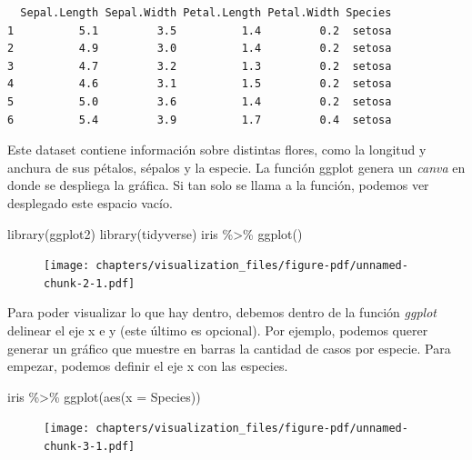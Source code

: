 \documentclass[
  letterpaper,
  DIV=11,
  numbers=noendperiod]{scrreprt}
\newenvironment{Shaded}{\begin{snugshade}}{\end{snugshade}}
\newcommand{\AttributeTok}[1]{\textcolor[rgb]{0.40,0.45,0.13}{#1}}
\newcommand{\FunctionTok}[1]{\textcolor[rgb]{0.28,0.35,0.67}{#1}}
\newcommand{\NormalTok}[1]{\textcolor[rgb]{0.00,0.23,0.31}{#1}}
\newcommand{\SpecialCharTok}[1]{\textcolor[rgb]{0.37,0.37,0.37}{#1}}
\begin{document}
\begin{verbatim}
  Sepal.Length Sepal.Width Petal.Length Petal.Width Species
1          5.1         3.5          1.4         0.2  setosa
2          4.9         3.0          1.4         0.2  setosa
3          4.7         3.2          1.3         0.2  setosa
4          4.6         3.1          1.5         0.2  setosa
5          5.0         3.6          1.4         0.2  setosa
6          5.4         3.9          1.7         0.4  setosa
\end{verbatim}

Este dataset contiene información sobre distintas flores, como la
longitud y anchura de sus pétalos, sépalos y la especie. La función
ggplot genera un \emph{canva} en donde se despliega la gráfica. Si tan
solo se llama a la función, podemos ver desplegado este espacio vacío.

\begin{Shaded}
\begin{Highlighting}[]
\FunctionTok{library}\NormalTok{(ggplot2)}
\FunctionTok{library}\NormalTok{(tidyverse)}
\NormalTok{iris }\SpecialCharTok{\%\textgreater{}\%} 
  \FunctionTok{ggplot}\NormalTok{()}
\end{Highlighting}
\end{Shaded}

\begin{figure}[H]

{\centering \texttt{[image: chapters/visualization\_files/figure-pdf/unnamed-chunk-2-1.pdf]}

}

\end{figure}

Para poder visualizar lo que hay dentro, debemos dentro de la función
\emph{ggplot} delinear el eje x e y (este último es opcional). Por
ejemplo, podemos querer generar un gráfico que muestre en barras la
cantidad de casos por especie. Para empezar, podemos definir el eje x
con las especies.

\begin{Shaded}
\begin{Highlighting}[]
\NormalTok{iris }\SpecialCharTok{\%\textgreater{}\%} 
  \FunctionTok{ggplot}\NormalTok{(}\FunctionTok{aes}\NormalTok{(}\AttributeTok{x =}\NormalTok{ Species))}
\end{Highlighting}
\end{Shaded}

\begin{figure}[H]

{\centering \texttt{[image: chapters/visualization\_files/figure-pdf/unnamed-chunk-3-1.pdf]}

}

\end{figure}
\end{document}
